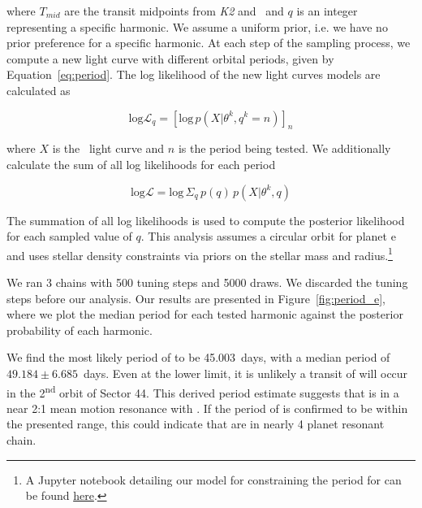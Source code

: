 \documentclass[linenumbers,modern,twocolumn]{aastex631}
\begin{document}
where $T_{mid}$ are the transit midpoints from \textit{K2} and \tess\ and $q$ is an integer representing a specific harmonic. We assume a uniform prior, i.e. we have no prior preference for a specific harmonic. At each step of the sampling process, we compute a new light curve with different orbital periods, given by Equation~\ref{eq:period}. The log likelihood of the new light curves models are calculated as

\begin{equation}
    \textrm{log} \mathcal{L}_q = \left[ \textrm{log}\, p \left( X | \theta^k, q^k = n \right) \right]_n
\end{equation}

where $X$ is the \tess\ light curve and $n$ is the period being tested. We additionally calculate the sum of all log likelihoods for each period 

\begin{equation}
    \textrm{log} \mathcal{L} = \textrm{log}\, \Sigma_q\, p(q)\, p(X|\theta^k, q) 
\end{equation}

The summation of all log likelihoods is used to compute the posterior likelihood for each sampled value of $q$. This analysis assumes a circular orbit for planet e and uses stellar density constraints via priors on the stellar mass and radius.\footnote{A Jupyter notebook detailing our model for constraining the period for \planete can be found \href{https://github.com/afeinstein20/v1298tau\_tess/blob/main/notebooks/V1298Tau\_e.ipynb}{here}.}

We ran 3 chains with 500 tuning steps and 5000 draws. We discarded the tuning steps before our analysis. Our results are presented in Figure~\ref{fig:period_e}, where we plot the median period for each tested harmonic against the posterior probability of each harmonic.

We find the most likely period of \planete to be 45.003~days, with a median period of $49.184 \pm 6.685$~days. Even at the lower limit, it is unlikely a transit of \planete will occur in the 2\textsuperscript{nd} orbit of Sector 44. This derived period estimate suggests that \planete is in a near 2:1 mean motion resonance with \planetb. If the period of \planete is confirmed to be within the presented range, this could indicate that \allplanets are in nearly 4 planet resonant chain.
\end{document}
